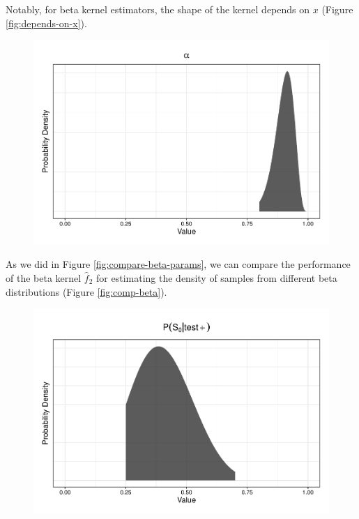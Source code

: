 \documentclass[12pt,twoside]{smiththesis}
\begin{document}
Notably, for beta kernel estimators, the shape of the kernel depends on \(x\) (Figure \ref{fig:depends-on-x}).
\begin{figure}

{\centering \includegraphics[width=1\linewidth]{thesis_files/figure-latex/unnamed-chunk-43-1} 

}

\caption{\label{fig:depends-on-x}}\label{fig:unnamed-chunk-43}
\end{figure}
As we did in Figure \ref{fig:compare-beta-params}, we can compare the performance of the beta kernel \(\hat f_2\) for estimating the density of samples from different beta distributions (Figure \ref{fig:comp-beta}).
\begin{figure}

{\centering \includegraphics[width=1\linewidth]{thesis_files/figure-latex/unnamed-chunk-45-1} 

}

\caption{\label{fig:comp-beta}}\label{fig:unnamed-chunk-45}
\end{figure}
\end{document}
